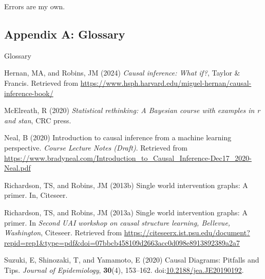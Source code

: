 \documentclass[
  single column]{article}
\newlength{\cslhangindent}
\newenvironment{CSLReferences}[2] %
 {\begin{list}{}{%
  \setlength{\itemindent}{0pt}
  \setlength{\leftmargin}{0pt}
  \setlength{\parsep}{0pt}
  \ifodd #1
   \setlength{\leftmargin}{\cslhangindent}
   \setlength{\itemindent}{-1\cslhangindent}
  \fi
  \setlength{\itemsep}{#2\baselineskip}}}
 {\end{list}}
\begin{document}
Errors are my own.

\subsection{Appendix A: Glossary}\label{appendix-a-glossary}

\begin{table}

\caption{\label{tbl-gloassary}Glossary}

\centering{

\glossaryTerms

}

\end{table}%

\label{refs}
\begin{CSLReferences}{1}{0}
Hernan, MA, and Robins, JM (2024) \emph{Causal inference: What if?},
Taylor \& Francis. Retrieved from
\url{https://www.hsph.harvard.edu/miguel-hernan/causal-inference-book/}

McElreath, R (2020) \emph{Statistical rethinking: A {B}ayesian course
with examples in r and stan}, CRC press.

Neal, B (2020) Introduction to causal inference from a machine learning
perspective. \emph{Course Lecture Notes (Draft)}. Retrieved from
\url{https://www.bradyneal.com/Introduction_to_Causal_Inference-Dec17_2020-Neal.pdf}

Richardson, TS, and Robins, JM (2013b) Single world intervention graphs:
A primer. In, Citeseer.

Richardson, TS, and Robins, JM (2013a) Single world intervention graphs:
A primer. In \emph{Second UAI workshop on causal structure learning,
{B}ellevue, {W}ashington}, Citeseer. Retrieved from
\url{https://citeseerx.ist.psu.edu/document?repid=rep1&type=pdf&doi=07bbcb458109d2663acc0d098e8913892389a2a7}

Suzuki, E, Shinozaki, T, and Yamamoto, E (2020) Causal Diagrams:
Pitfalls and Tips. \emph{Journal of Epidemiology}, \textbf{30}(4),
153--162.
doi:\href{https://doi.org/10.2188/jea.JE20190192}{10.2188/jea.JE20190192}.

\end{CSLReferences}
\end{document}
